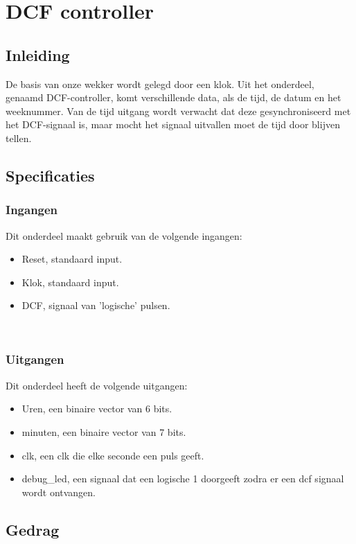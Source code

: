 \chapter{DCF controller}
\section{Inleiding}
De basis van onze wekker wordt gelegd door een klok. Uit het onderdeel, genaamd DCF-controller,  komt verschillende data, als de tijd, de datum en het weeknummer. Van de tijd uitgang wordt verwacht dat deze gesynchroniseerd met het DCF-signaal is, maar mocht het signaal uitvallen moet de tijd door blijven tellen.

\section{Specificaties}
\subsection{Ingangen}
Dit onderdeel maakt gebruik van de volgende ingangen:
\newline
\begin{itemize}[nolistsep]
\item Reset, standaard input.
\item Klok, standaard input.
\item DCF, signaal van 'logische' pulsen.
\end{itemize}
\noindent
\\
\subsection{Uitgangen}
Dit onderdeel heeft de volgende uitgangen:
\begin{itemize}[nolistsep]
\item Uren, een binaire vector van 6 bits.
\item minuten, een binaire vector van 7 bits.
\item clk, een clk die elke seconde een puls geeft.
\item debug\_led, een signaal dat een logische 1 doorgeeft zodra er een dcf signaal wordt ontvangen.
\end{itemize}

\section{Gedrag}

